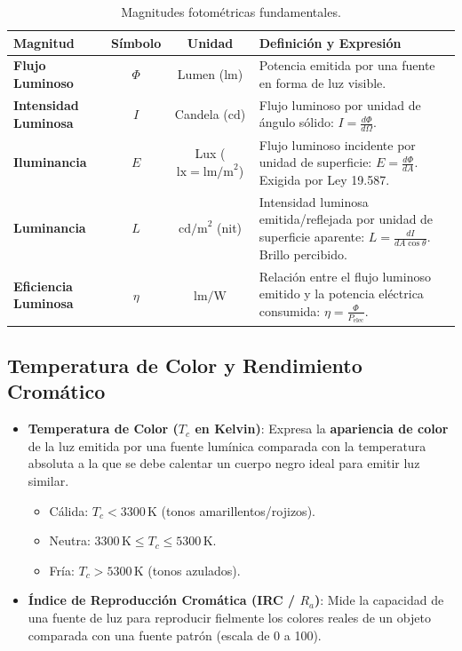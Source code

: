\documentclass[]{informeutn}
\begin{document}
\begin{table}[H]
\centering
\begin{tabular}{|p{3.8cm}|c|c|p{5.5cm}|}
\hline
\rowcolor{blue!15}\textbf{Magnitud} & \textbf{Símbolo} & \textbf{Unidad} & \textbf{Definición y Expresión} \\ \hline
\textbf{Flujo Luminoso} & $\Phi$ & Lumen ($\text{lm}$) & Potencia emitida por una fuente en forma de luz visible. \\ \hline
\textbf{Intensidad Luminosa} & $I$ & Candela ($\text{cd}$) & Flujo luminoso por unidad de ángulo sólido: $I = \frac{d\Phi}{d\Omega}$. \\ \hline
\textbf{Iluminancia} & $E$ & Lux ($\text{lx} = \text{lm/m}^2$) & Flujo luminoso incidente por unidad de superficie: $E = \frac{d\Phi}{dA}$. Exigida por Ley 19.587. \\ \hline
\textbf{Luminancia} & $L$ & $\text{cd/m}^2$ (nit) & Intensidad luminosa emitida/reflejada por unidad de superficie aparente: $L = \frac{dI}{dA \cos\theta}$. Brillo percibido. \\ \hline
\textbf{Eficiencia Luminosa} & $\eta$ & $\text{lm/W}$ & Relación entre el flujo luminoso emitido y la potencia eléctrica consumida: $\eta = \frac{\Phi}{P_{\text{elec}}}$. \\ \hline
\end{tabular}
\caption{Magnitudes fotométricas fundamentales.}
\end{table}

\subsection{Temperatura de Color y Rendimiento Cromático}
\begin{itemize}
    \item \textbf{Temperatura de Color ($T_c$ en Kelvin)}: Expresa la \textbf{apariencia de color} de la luz emitida por una fuente lumínica comparada con la temperatura absoluta a la que se debe calentar un cuerpo negro ideal para emitir luz similar.
    \begin{itemize}
        \item Cálida: $T_c < 3300\,\text{K}$ (tonos amarillentos/rojizos).
        \item Neutra: $3300\,\text{K} \le T_c \le 5300\,\text{K}$.
        \item Fría: $T_c > 5300\,\text{K}$ (tonos azulados).
    \end{itemize}
    \item \textbf{Índice de Reproducción Cromática (IRC / $R_a$)}: Mide la capacidad de una fuente de luz para reproducir fielmente los colores reales de un objeto comparada con una fuente patrón (escala de 0 a 100).

\end{itemize}
\end{document}

